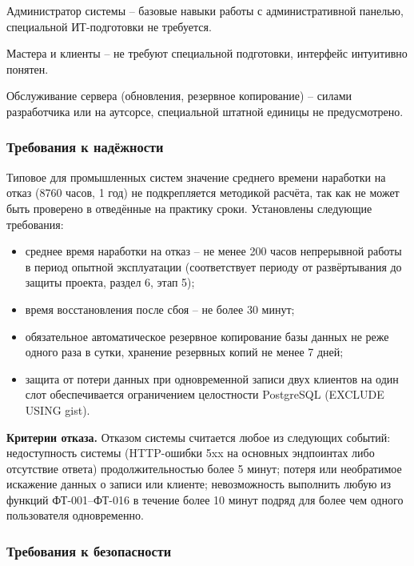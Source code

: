 Администратор системы -- базовые навыки работы с административной панелью, специальной ИТ-подготовки не требуется.

Мастера и клиенты -- не требуют специальной подготовки, интерфейс интуитивно понятен.

Обслуживание сервера (обновления, резервное копирование) -- силами разработчика или на аутсорсе, специальной штатной единицы не предусмотрено.

\subsubsection{Требования к надёжности}

Типовое для промышленных систем значение среднего времени наработки на отказ (8760 часов, 1 год) не подкрепляется методикой расчёта, так как не может быть проверено в отведённые на практику сроки. Установлены следующие требования:

\begin{itemize}
  \item среднее время наработки на отказ -- не менее 200 часов непрерывной работы в период опытной эксплуатации (соответствует периоду от развёртывания до защиты проекта, раздел 6, этап 5);
  \item время восстановления после сбоя -- не более 30 минут;
  \item обязательное автоматическое резервное копирование базы данных не реже одного раза в сутки, хранение резервных копий не менее 7 дней;
  \item защита от потери данных при одновременной записи двух клиентов на один слот обеспечивается ограничением целостности PostgreSQL (EXCLUDE USING gist).
\end{itemize}

\textbf{Критерии отказа.} Отказом системы считается любое из следующих событий: недоступность системы (HTTP-ошибки 5xx на основных эндпоинтах либо отсутствие ответа) продолжительностью более 5 минут; потеря или необратимое искажение данных о записи или клиенте; невозможность выполнить любую из функций ФТ-001--ФТ-016 в течение более 10 минут подряд для более чем одного пользователя одновременно.

\subsubsection{Требования к безопасности}

